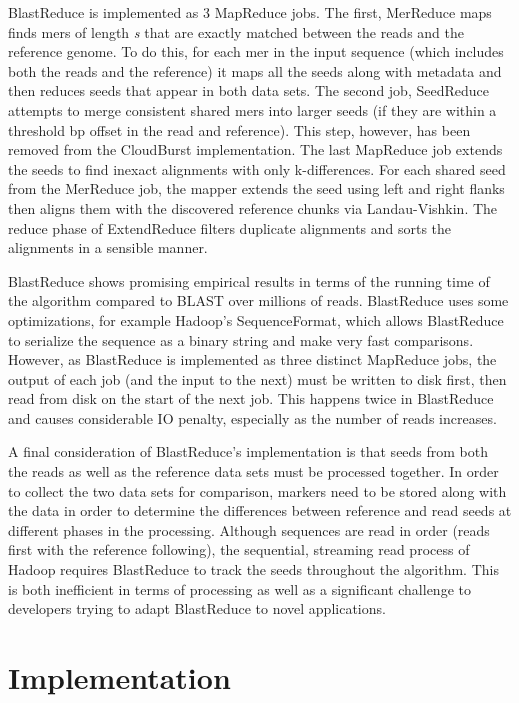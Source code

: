 \documentclass[conference,letterpaper,11pt]{IEEEtran}
\begin{document}
    BlastReduce is implemented as 3 MapReduce jobs. The first, MerReduce maps finds mers of length \textit{s} that are exactly matched between the reads and the reference genome. To do this, for each mer in the input sequence (which includes both the reads and the reference) it maps all the seeds along with metadata and then reduces seeds that appear in both data sets. The second job, SeedReduce attempts to merge consistent shared mers into larger seeds (if they are within a threshold bp offset in the read and reference). This step, however, has been removed from the CloudBurst implementation. The last MapReduce job extends the seeds to find inexact alignments with only k-differences. For each shared seed from the MerReduce job, the mapper extends the seed using left and right flanks then aligns them with the discovered reference chunks via Landau-Vishkin. The reduce phase of ExtendReduce filters duplicate alignments and sorts the alignments in a sensible manner. 
    
    BlastReduce shows promising empirical results in terms of the running time of the algorithm compared to BLAST over millions of reads. BlastReduce uses some optimizations, for example Hadoop's SequenceFormat, which allows BlastReduce to serialize the sequence as a binary string and make very fast comparisons. However, as BlastReduce is implemented as three distinct MapReduce jobs, the output of each job (and the input to the next) must be written to disk first, then read from disk on the start of the next job. This happens twice in BlastReduce and causes considerable IO penalty, especially as the number of reads increases. 

	A final consideration of BlastReduce's implementation is that seeds from both the reads as well as the reference data sets must be processed together. In order to collect the two data sets for comparison, markers need to be stored along with the data in order to determine the differences between reference and read seeds at different phases in the processing. Although sequences are read in order (reads first with the reference following), the sequential, streaming read process of Hadoop requires BlastReduce to track the seeds throughout the algorithm. This is both inefficient in terms of processing as well as a significant challenge to developers trying to adapt BlastReduce to novel applications.

\section{Implementation}
\end{document}
